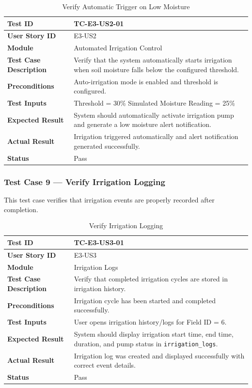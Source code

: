 \begin{longtable}{|p{4cm}|p{8cm}|}
\caption{Verify Automatic Trigger on Low Moisture}
\label{tab:tc_auto} \\
\hline
\textbf{Test ID} & TC-E3-US2-01 \\ \hline
\textbf{User Story ID} & E3-US2 \\ \hline
\textbf{Module} & Automated Irrigation Control \\ \hline
\textbf{Test Case Description} & Verify that the system 
automatically starts irrigation when soil moisture falls below the 
configured threshold. \\ \hline
\textbf{Preconditions} & Auto-irrigation mode is enabled and 
threshold is configured. \\ \hline
\textbf{Test Inputs} &
Threshold = 30\% \newline
Simulated Moisture Reading = 25\% \\ \hline
\textbf{Expected Result} & System should automatically activate 
irrigation pump and generate a low moisture alert notification. \\ 
\hline
\textbf{Actual Result} & Irrigation triggered automatically and 
alert notification generated successfully. \\ \hline
\textbf{Status} & Pass \\ \hline
\end{longtable}

\subsubsection{Test Case 9 --- Verify Irrigation Logging}

This test case verifies that irrigation events are properly recorded 
after completion.

\begin{longtable}{|p{4cm}|p{8cm}|}
\caption{Verify Irrigation Logging}
\label{tab:tc_irrigation_logging} \\
\hline
\textbf{Test ID} & TC-E3-US3-01 \\ \hline
\textbf{User Story ID} & E3-US3 \\ \hline
\textbf{Module} & Irrigation Logs \\ \hline
\textbf{Test Case Description} & Verify that completed irrigation 
cycles are stored in irrigation history. \\ \hline
\textbf{Preconditions} & Irrigation cycle has been started and 
completed successfully. \\ \hline
\textbf{Test Inputs} & User opens irrigation history/logs for 
Field ID = 6. \\ \hline
\textbf{Expected Result} & System should display irrigation start 
time, end time, duration, and pump status in 
\texttt{irrigation\_logs}. \\ \hline
\textbf{Actual Result} & Irrigation log was created and displayed 
successfully with correct event details. \\ \hline
\textbf{Status} & Pass \\ \hline
\end{longtable}

